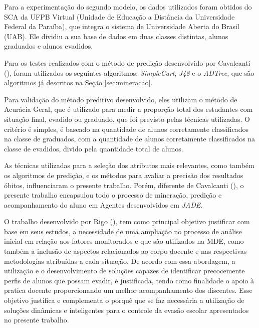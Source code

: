 Para a experimentação do segundo modelo, os dados utilizados foram obtidos do SCA da UFPB Virtual (Unidade de Educação a Distância da Universidade Federal da Paraíba), que integra o sistema de Universidade Aberta do Brasil (UAB). Ele dividiu a sua base de dados em duas classes distintas, alunos graduados e alunos evadidos.

Para os testes realizados com o método de predição desenvolvido por Cavalcanti (\citeyear{cavalcantimineraccao}), foram utilizados os seguintes algoritmos: \textit{SimpleCart}, \textit{J48} e o \textit{ADTree}, que são algoritmos já descritos na Seção \ref{sec:mineracao}.

Para validação do método preditivo desenvolvido, eles utilizam o método de Acurácia Geral, que é utilizado para medir a proporção total dos estudantes com situação final, evadido ou graduado, que foi previsto pelas técnicas utilizadas. O critério é simples, é baseado na quantidade de alunos corretamente classificados na classe de graduados, com a quantidade de alunos corretamente classificados na classe de evadidos, divido pela quantidade total de alunos.

As técnicas utilizadas para a seleção dos atributos mais relevantes, como também os algoritmos de predição, e os métodos para avaliar a precisão dos resultados óbitos, influenciaram o presente trabalho. Porém, diferente de Cavalcanti (\citeyear{cavalcantimineraccao}), o presente trabalho encapsulou todo o processo de mineração, predição e acompanhamento do aluno em Agentes desenvolvidos em \textit{JADE}.

\label{ref:rigo}

O trabalho desenvolvido por Rigo (\citeyear{rigo2012minerando}), tem como principal objetivo justificar com base em seus estudos, a necessidade de uma ampliação no processo de análise inicial em relação aos fatores monitorados e que são utilizados na MDE, como também a inclusão de aspectos relacionados ao corpo docente e nas respectivas metodologias atribuídas a cada situação. De acordo com essa abordagem, a utilização e o desenvolvimento de soluções capazes de identificar precocemente perfis de alunos que possam evadir, é justificada, tendo como finalidade o apoio à pratica docente proporcionando um melhor acompanhamento dos discentes. Esse objetivo justifica e complementa o porquê que se faz necessária a utilização de soluções dinâmicas e inteligentes para o controle da evasão escolar apresentados no presente trabalho.


